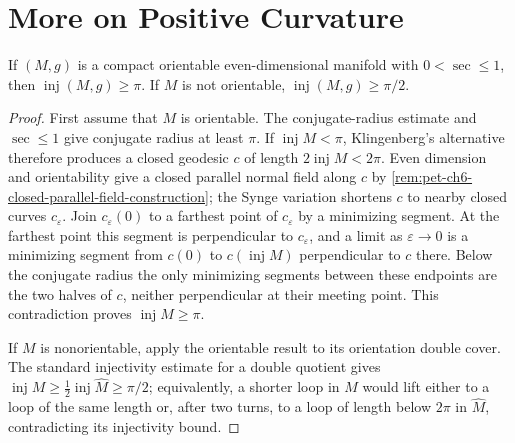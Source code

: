 \section{More on Positive Curvature}

\begin{theorem}
  \label{thm:pet-ch6-klingenberg-even-dim-injectivity}
  If $(M,g)$ is a compact orientable even-dimensional manifold with
  $0<\sec\le1$, then $\operatorname{inj}(M,g)\ge\pi$. If $M$ is not orientable,
  $\operatorname{inj}(M,g)\ge\pi/2$.
\end{theorem}
\begin{proof}
  \sketch
  First assume that $M$ is orientable. The conjugate-radius estimate and
  $\sec\le1$ give conjugate radius at least $\pi$. If
  $\operatorname{inj}M<\pi$, Klingenberg's alternative therefore produces a
  closed geodesic $c$ of length $2\operatorname{inj}M<2\pi$. Even dimension and
  orientability give a closed parallel normal field along $c$ by
  \cref{rem:pet-ch6-closed-parallel-field-construction}; the Synge variation
  shortens $c$ to nearby closed curves $c_\varepsilon$. Join
  $c_\varepsilon(0)$ to a farthest point of $c_\varepsilon$ by a minimizing
  segment. At the farthest point this segment is perpendicular to
  $c_\varepsilon$, and a limit as $\varepsilon\to0$ is a minimizing segment
  from $c(0)$ to $c(\operatorname{inj}M)$ perpendicular to $c$ there. Below
  the conjugate radius the only minimizing segments between these endpoints
  are the two halves of $c$, neither perpendicular at their meeting point.
  This contradiction proves $\operatorname{inj}M\ge\pi$.

  If $M$ is nonorientable, apply the orientable result to its orientation
  double cover. The standard injectivity estimate for a double quotient gives
  $\operatorname{inj}M\ge\tfrac12\operatorname{inj}\widehat M\ge\pi/2$;
  equivalently, a shorter loop in $M$ would lift either to a loop of the same
  length or, after two turns, to a loop of length below $2\pi$ in
  $\widehat M$, contradicting its injectivity bound.
\end{proof}

